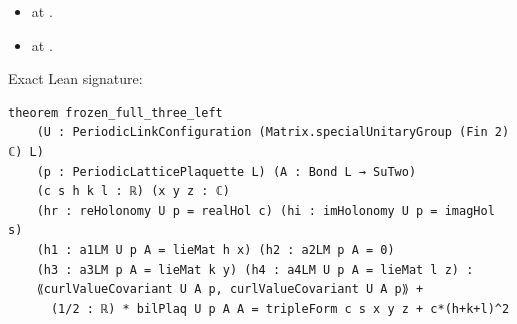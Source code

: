 \begin{theorem}[bp-208]
\begin{itemize}
\item \texttt{} at \texttt{}.
\item \texttt{} at \texttt{}.
\end{itemize}
\par Exact Lean signature:
\begin{verbatim}
theorem frozen_full_three_left
    (U : PeriodicLinkConfiguration (Matrix.specialUnitaryGroup (Fin 2) ℂ) L)
    (p : PeriodicLatticePlaquette L) (A : Bond L → SuTwo)
    (c s h k l : ℝ) (x y z : ℂ)
    (hr : reHolonomy U p = realHol c) (hi : imHolonomy U p = imagHol s)
    (h1 : a1LM U p A = lieMat h x) (h2 : a2LM p A = 0)
    (h3 : a3LM p A = lieMat k y) (h4 : a4LM U p A = lieMat l z) :
    ⟪curlValueCovariant U A p, curlValueCovariant U A p⟫ +
      (1/2 : ℝ) * bilPlaq U p A A = tripleForm c s x y z + c*(h+k+l)^2
\end{verbatim}
\end{theorem}

